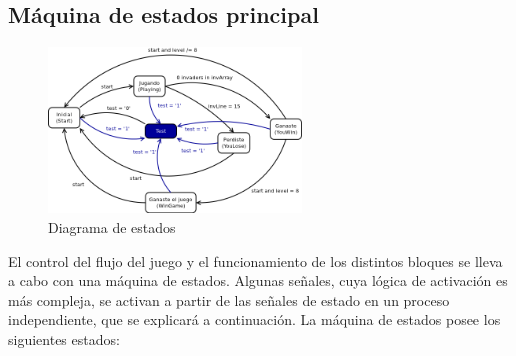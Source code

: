 \subsection{Máquina de estados principal}
\label{statemachine}

\begin{figure}[H]
	\centering
	\includegraphics[width=0.6\textwidth]{statemachine.png}
	\caption{Diagrama de estados }\label{fig:statemachine}
\end{figure}

El control del flujo del juego y el funcionamiento de los distintos bloques se lleva a cabo con una máquina de estados. Algunas señales, cuya lógica de activación es más compleja, se activan a partir de las señales de estado en un proceso independiente, que se explicará a continuación. La máquina de estados posee los siguientes estados:

